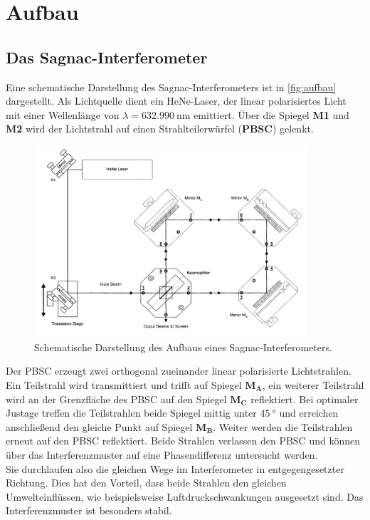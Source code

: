 \section{Aufbau}
\subsection{Das Sagnac-Interferometer}
\label{sec:sagnac}
Eine schematische Darstellung des Sagnac-Interferometers ist in \autoref{fig:aufbau} dargestellt.
Als Lichtquelle dient ein HeNe-Laser, der linear polarisiertes Licht mit einer Wellenlänge von $\lambda = \qty{632.990}{\nano\metre}$ emittiert.
Über die Spiegel \textbf{M1} und \textbf{M2} wird der Lichtstrahl auf einen Strahlteilerwürfel (\textbf{PBSC}) gelenkt.
\begin{figure}
    \centering
    \includegraphics[width=0.9\textwidth]{img/aufbau_schematisch.png}
    \caption{Schematische Darstellung des Aufbaus eines Sagnac-Interferometers. \cite{sample}}
    \label{fig:aufbau}
\end{figure}
Der PBSC erzeugt zwei orthogonal zueinander linear polarisierte Lichtstrahlen.
Ein Teilstrahl wird transmittiert und trifft auf Spiegel $\mathbf{M_A}$, ein weiterer Teilstrahl wird an der Grenzfläche des PBSC auf den Spiegel $\mathbf{M_C}$ reflektiert.
Bei optimaler Justage treffen die Teilstrahlen beide Spiegel mittig unter $\qty{45}{\degree}$ und erreichen anschließend den gleiche Punkt auf Spiegel $\mathbf{M_B}$.
Weiter werden die Teilstrahlen erneut auf den PBSC reflektiert.
Beide Strahlen verlassen den PBSC und können über das Interferenzmuster auf eine Phasendifferenz untersucht werden.
\\
Sie durchlaufen also die gleichen Wege im Interferometer in entgegengesetzter Richtung.
Dies hat den Vorteil, dass beide Strahlen den gleichen Umwelteinflüssen, wie beispielsweise Luftdruckschwankungen ausgesetzt sind.
Das Interferenzmuster ist besonders stabil.
\FloatBarrier

